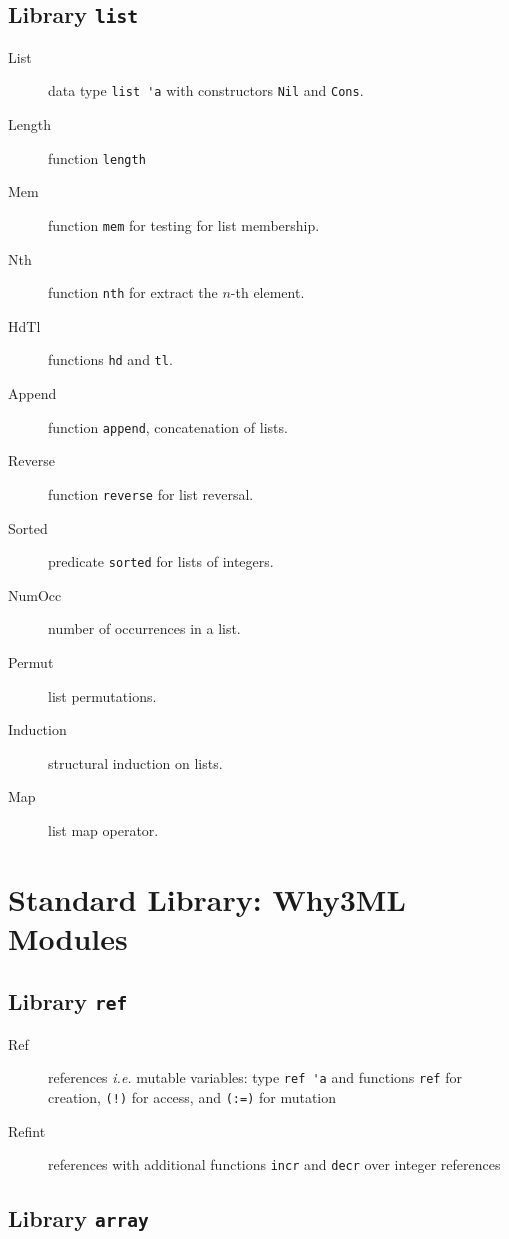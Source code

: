 \section{Library \texttt{list}}

\begin{description}
\item[List] data type \verb|list 'a| with constructors \verb|Nil| and
  \verb|Cons|.
\item[Length] function \verb|length|
\item[Mem] function \verb|mem| for testing for list membership.
\item[Nth] function \verb|nth| for extract the $n$-th element.
\item[HdTl] functions \verb|hd| and \verb|tl|.
\item[Append] function \verb|append|, concatenation of lists.
\item[Reverse] function \verb|reverse| for list reversal.
\item[Sorted] predicate \verb|sorted| for lists of integers.
\item[NumOcc] number of occurrences in a list.
\item[Permut] list permutations.
\item[Induction] structural induction on lists.
\item[Map] list map operator.
\end{description}


\chapter{Standard Library: Why3ML Modules}
\label{chap:mllibrary}

\section{Library \texttt{ref}}

\begin{description}
\item[Ref] references \emph{i.e.} mutable variables:
  type \verb|ref 'a| and functions \verb|ref| for creation,
  \verb|(!)| for access, and \verb|(:=)| for mutation
\item[Refint] references with additional functions \texttt{incr} and
  \texttt{decr} over integer references
\end{description}

\section{Library \texttt{array}}

